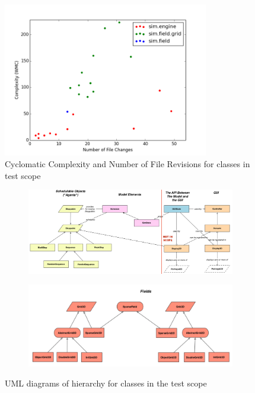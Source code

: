 \documentclass[11pt]{article}
\begin{document}
\begin{figure}[htp]
\centering
\includegraphics[width=0.8\textwidth]{Appendix/complexityVchange}
\caption{Cyclomatic Complexity and Number of File Revisions for classes in test scope}
\label{fig:complexityVchange}
\end{figure}

\begin{figure}[htp]
\begin{subfigure}[b]{\textwidth}
\includegraphics[width=\textwidth]{Appendix/UML}
\end{subfigure}
\begin{subfigure}[b]{\textwidth}
\includegraphics[width=\textwidth]{Appendix/UML_fields}
\end{subfigure}
\caption{UML diagrams of hierarchy for classes in the test scope\cite{mason_uml}}
\label{fig:uml}
\end{figure}
\end{document}
